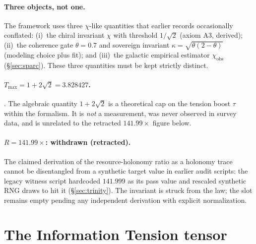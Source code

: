 \documentclass{alienfolio}
\begin{document}
\paragraph{Three objects, not one.} The framework uses three $\chi$-like
quantities that earlier records occasionally conflated: (i)~the chiral
invariant $\chi$ with threshold $1/\sqrt{2}$ (axiom A3, derived);
(ii)~the coherence gate $\theta = 0.7$ and sovereign invariant
$\kappa = \sqrt{\theta(2-\theta)}$ (modeling choice plus fit); and
(iii)~the galactic empirical estimator $\chi_{\mathrm{obs}}$
(\S\ref{sec:sparc}). These three quantities must be kept strictly
distinct.

\paragraph{$T_{\max} = 1 + 2\sqrt{2} = 3.828427$.}
. The algebraic quantity $1 + 2\sqrt{2}$ is a
theoretical cap on the tension boost $\tau$ within the formalism. It is
\emph{not} a measurement, was never observed in survey data, and is
unrelated to the retracted $141.99\times$ figure below.

\paragraph{$R = 141.99\times$: withdrawn (retracted).} The claimed
derivation of the resource-holonomy ratio as a holonomy trace cannot be
disentangled from a synthetic target value in earlier audit scripts: the
legacy witness script hardcoded $141.999$ as its pass value and
rescaled synthetic RNG draws to hit it (\S\ref{sec:trinity}). The
invariant is struck from the law; the slot remains empty pending any
independent derivation with explicit normalization.

\goldrule

\section{The Information Tension tensor}
\label{sec:tensor}
\end{document}
